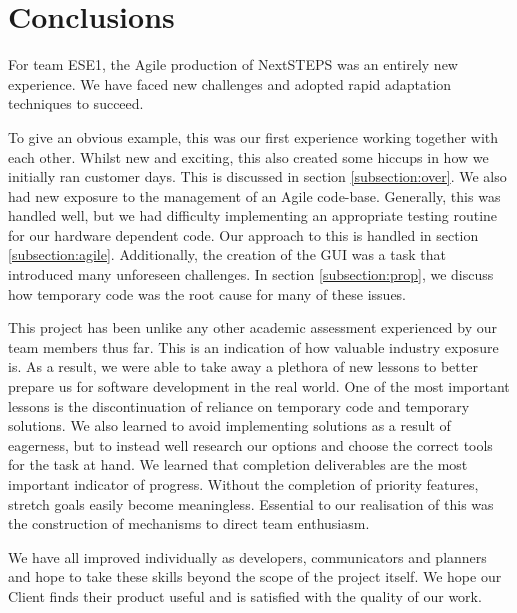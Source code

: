 \documentclass{l3proj}
\begin{document}
 


\section{Conclusions}
For team ESE1, the Agile production of NextSTEPS was an entirely new experience. We have faced new challenges and adopted rapid adaptation techniques to succeed. 

To give an obvious example, this was our first experience working together with each other. Whilst new and exciting, this also created some hiccups in how we initially ran customer days. This is discussed in section \ref{subsection:over}. We also had new exposure to the management of an Agile code-base. Generally, this was handled well, but we had difficulty implementing an appropriate testing routine for our hardware dependent code. Our approach to this is handled in section \ref{subsection:agile}. Additionally, the creation of the GUI was a task that introduced many unforeseen challenges. In section \ref{subsection:prop}, we discuss how temporary code was the root cause for many of these issues. 

This project has been unlike any other academic assessment experienced by our team members thus far. This is an indication of how valuable industry exposure is. As a result, we were able to take away a plethora of new lessons to better prepare us for software development in the real world. One of the most important lessons is the discontinuation of reliance on temporary code and temporary solutions. We also learned to avoid implementing solutions as a result of eagerness, but to instead well research our options and choose the correct tools for the task at hand. We learned that completion deliverables are the most important indicator of progress. Without the completion of priority features, stretch goals easily become meaningless. Essential to our realisation of this was the construction of mechanisms to direct team enthusiasm. 

We have all improved individually as developers, communicators and planners and hope to take these skills beyond the scope of the project itself. We hope our Client finds their product useful and is satisfied with the quality of our work.

\newpage


\end{document}
